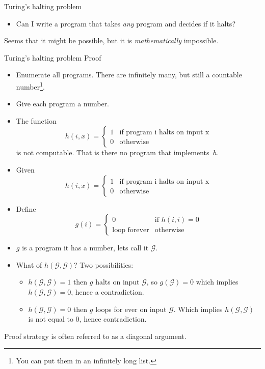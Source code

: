 \documentclass[handout]{beamer}
\begin{document}
\begin{frame}{Turing's halting problem}
  \begin{itemize}
  \item Can I write  a program that takes {\em any} program and
    decides if it halts?
  \end{itemize}
  Seems that it might be possible, but it is {\it mathematically} impossible.

 
\end{frame}
\begin{frame}{Turing's halting problem}
Proof
  \begin{itemize}
  \item  Enumerate all programs. There are infinitely many, but still
    a countable number\footnote{You can put them in an infinitely long list.}.
  \item Give each program a number. 
  \item The function
    \[
      h(i,x) = \begin{cases}
               1 & \text{if program i halts on input x} \\
               0 & \text{otherwise}
               \end{cases}
    \]
is not computable. That is there no program that implements~$h$. 
  \end{itemize}
\end{frame}
\begin{frame}
  \begin{itemize}
  \item   Given
    \[
      h(i,x) = \begin{cases}
               1 & \text{if program i halts on input x} \\
               0 & \text{otherwise}
               \end{cases}
    \]
  \item Define
    \[
    g(i) = \begin{cases}
             0 & \text{if $h(i,i) = 0$} \\
             \text{loop forever} & \text{otherwise}
           \end{cases}
    \]
\item $g$ is a program it has a number, lets call it $\mathcal{G}$.
\item What of $h(\mathcal{G},\mathcal{G})$? Two possibilities:
  \begin{itemize}
  \item  $h(\mathcal{G},\mathcal{G}) = 1$ \pause then $g$ halts on input $\mathcal{G}$, so $g(\mathcal{G})=0$ which
    implies $h(\mathcal{G},\mathcal{G}) =  0$, hence a contradiction. \pause
  \item $h(\mathcal{G},\mathcal{G}) = 0$ \pause then $g$ loops for
    ever on input $\mathcal{G}$. Which implies
    $h(\mathcal{G},\mathcal{G})$ is not equal to 0, hence contradiction.
  \end{itemize}
  \end{itemize}
Proof strategy is often referred to as a diagonal argument. 
\end{frame}
\end{document}
